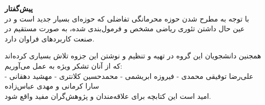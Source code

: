 \textbf{\huge
پیش‌گفتار
}
\vspace{.8cm}
\\

با توجه به مطرح شدن حوزه محرمانگی تفاضلی که حوزه‌ای بسیار جدید است و در عین حال داشتن تئوری ریاضی مشخص و فرمول‌بندی شده، به صورت مستقیم در صنعت کاربردهای فراوان دارد.
\\
\vspace{.4cm}

همجنین دانشجویان این گروه در تهیه و تنظیم و نوشتن این جزوه تلاش بسیاری کرده‌اند که از آنان تشکر ویژه به عمل می‌آوریم:
\\
علی‌رضا توفیقی محمدی - فیروزه ابریشمی - محمدحسین کلانتری - مهشید دهقانی - سارا کرمانی و مهدی عباس‌زاده
\\

\vspace{14cm}
امید است این کتابچه برای علاقه‌مندان و پژوهش‌گران مفید واقع شود.